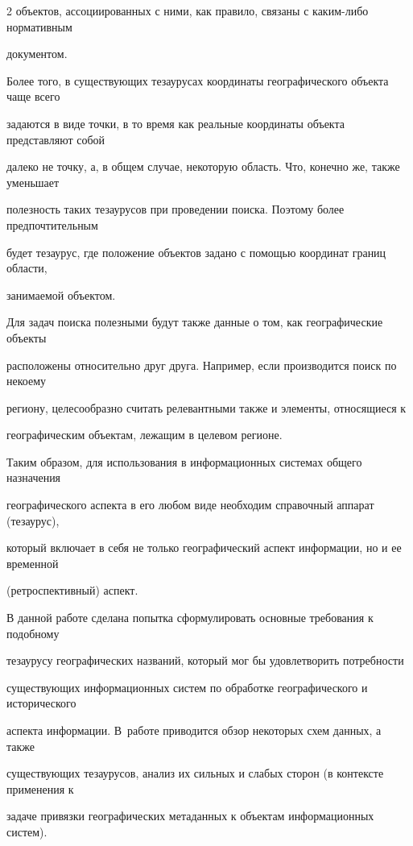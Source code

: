 \begin{multicols}{2}
объектов, ассоциированных с ними, как правило, связаны с каким-либо нормативным 

документом.

  

  Более того, в существующих тезаурусах координаты географического объекта чаще всего 

задаются в виде точки, в то время как реальные координаты объекта представляют собой 

далеко не точку, а, в общем случае, некоторую область. Что, конечно же, также уменьшает 

полезность таких тезаурусов при проведении поиска. Поэтому более предпочтительным 

будет тезаурус, где положение объектов задано с помощью координат границ области, 

занимаемой объектом.

  

  Для задач поиска полезными будут также данные о том, как географические объекты 

расположены относительно друг друга. Например, если производится поиск по некоему 

региону, целесообразно считать релевантными также и элементы, относящиеся к 

географическим объектам, лежащим в целевом регионе.

  

  Таким образом, для использования в информационных системах общего назначения 

географического аспекта в его любом виде необходим справочный аппарат (тезаурус), 

который включает в себя не только географический аспект информации, но и ее временной 

(ретроспективный) аспект.

  

  В данной работе сделана попытка сформулировать основные требования к подобному 

тезаурусу географических названий, который мог бы удовлетворить потребности 

существующих информационных систем по обработке географического и исторического 

аспекта информации. В~работе приводится обзор некоторых схем данных, а также 

существующих тезаурусов, анализ их сильных и слабых сторон (в контексте применения к 

задаче привязки географических метаданных к объектам информационных систем). 


\end{multicols}
